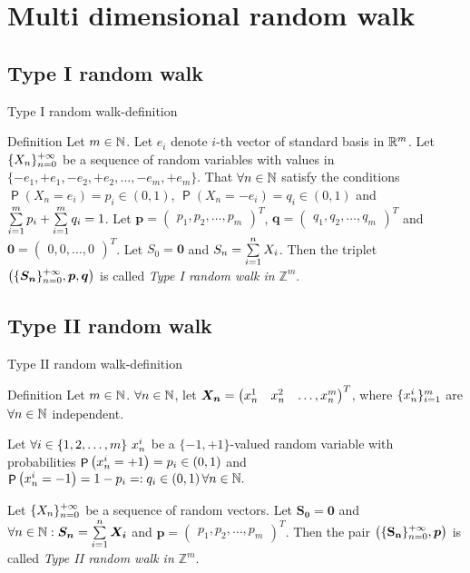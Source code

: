 \documentclass{beamer}
\DeclareMathOperator{\pr}{\mathsf{P}}
\begin{document}
\section{Multi dimensional random walk}
\renewcommand{\rw}{$\left( \{\boldsymbol{S_n}\}_{n=0}^\pinf, \boldsymbol{p}\right)$}
\subsection{Type I random walk}
\begin{frame}{Type I random walk-definition}
\begin{block}{Definition}
  Let $m \in \mathbb{N}$. Let $e_i$ denote $i$-th vector of standard basis in $\mathbb{R}^m$. Let $\{X_n\}_{n=0}^{+\infty}$ be a sequence of \iid random variables with values in $\{ -e_1, +e_1, -e_2, +e_2, \ldots, -e_m, +e_m\}$.
 That $\forall n \in \mathbb{N}$ satisfy the conditions $\pr\left(X_n=e_i \right)=p_i \in \left(0,1\right)$, $\pr\left(X_n=-e_i \right)=q_i \in \left(0,1\right)$ and $\suma[i][1][m] p_i+\suma[i][1][m]q_i=1$.
 Let $\boldsymbol{p}=\begin{pmatrix}
  p_1, p_2, \ldots, p_m
\end{pmatrix}^T$, $\boldsymbol{q}=\begin{pmatrix}
  q_1, q_2, \ldots, q_m
\end{pmatrix}^T$ and $\boldsymbol{0}=\begin{pmatrix}
   0, 0, \ldots, 0
 \end{pmatrix}^T$. Let $S_0=\boldsymbol{0}$ and $S_n=\suma X_i$. Then the triplet $\left(\{\boldsymbol{S_n}\}_{n=0}^{+\infty}, \boldsymbol{p}, \boldsymbol{q} \right)$ is called \emph{Type I random walk in $\mathbb{Z}^m$}.
\end{block}
\end{frame}
\subsection{Type II random walk}
\begin{frame}{Type II random walk-definition}
\begin{block}{Definition}
  Let $m \in \mathbb{N}$. $\forall n \in \mathbb{N}$, let $\boldsymbol{X_n}=\begin{pmatrix} \x[1] & \x[2]& \ldots, \x[m]\end{pmatrix}^T$, where $\{\x[i]\}_{i=1}^{m}$ are $\forall n \in \mathbb{N}$ independent.

 Let $\forall i \in \jm \ \x[i]$ be a $\{-1,+1\}$-valued random variable with probabilities $\pr \left(\x[i]=+1\right)=p_i \in \left(0,1\right)$ and $\pr \left(\x[i]=-1\right)=1-p_i=:q_i \in  \left(0,1 \right) \forall n \in \N.$

 Let $\{X_n\}_{n=0}^{+\infty}$ be a sequence of \iid random vectors. Let $\boldsymbol{S_0}=\boldsymbol{0}$ and $\forall n \in \N: \boldsymbol{S_n}=\suma \boldsymbol{X_i}$ and $\boldsymbol{p}=\begin{pmatrix}
  p_1, p_2, \ldots, p_m
\end{pmatrix}^T$. Then the pair $\left(\{\mathbf{S_n}\}_{n=0}^{+\infty}, \boldsymbol{p} \right)$ is called \emph{Type II random walk in $\mathbb{Z}^m$}.
\end{block}
\end{frame}
\end{document}
